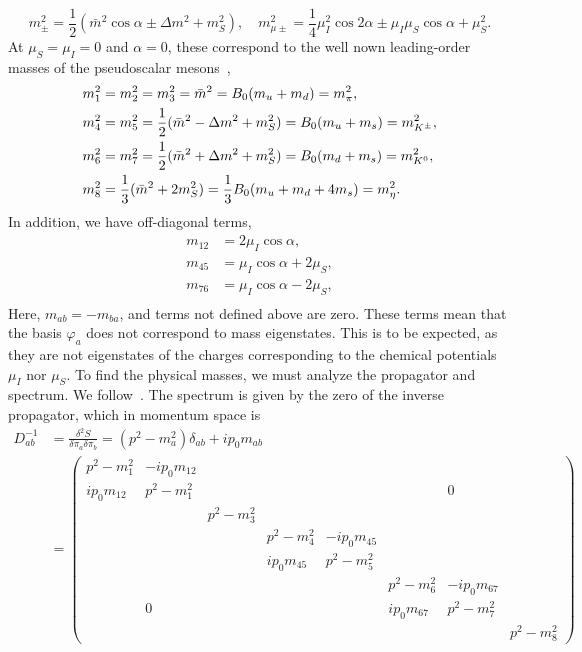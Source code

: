 %
\begin{equation}
    m_\pm^2 = \frac{1}{2} (\bar m^2 \cos\alpha \pm \Delta m^2 + m_S^2),
    \quad
    m^2_{\mu\pm } = \frac{1}{4}\mu_I^2 \cos2\alpha \pm \mu_I\mu_S \cos\alpha + \mu_S^2.
\end{equation}
%
At $\mu_S = \mu_I = 0$ and $\alpha = 0$, these correspond to the well nown leading-order masses of the pseudoscalar mesons~\autocite{eckerChiralPerturbationTheory1995},
%
\begin{align}
    m_1^2 & = m_2^2 = m_3^2 
    = \bar m^2 
    = B_0(m_u + m_d) = m_\pi^2, \\
    m_4^2 & = m_5^2 
    = \frac{1}{2} (\bar m^2 - \Delta m^2 + m_S^2) 
    = B_0(m_u + m_s) = m_{{K^\pm}}^2, \\
    m_6^2 &= m_7^2 
    = \frac{1}{2} (\bar m^2 + \Delta m^2 + m_S^2) 
    = B_0(m_d + m_s) = m_{{K^0} }^2, \\
    m_8^2 
    &= \frac{1}{3}(\bar m^2  + 2m_S^2) 
    = \frac{1}{3}B_0(m_u + m_d + 4m_s) = m_\eta^2 .
\end{align}
%
In addition, we have off-diagonal terms,
%
\begin{align}
    m_{12} & = 2 \mu_I\cos\alpha,\\
    m_{45} & =\mu_I\cos\alpha + 2\mu_S, \\
    m_{76} & = \mu_I\cos\alpha - 2\mu_S, \\
\end{align}
Here, $m_{ab} = -m_{ba}$, and terms not defined above are zero.
These terms mean that the basis $\varphi_a$ does not correspond to mass eigenstates.
This is to be expected, as they are not eigenstates of the charges corresponding to the chemical potentials $\mu_I$ nor $\mu_S$.
To find the physical masses, we must analyze the propagator and spectrum.
We follow~\autocite{adhikariTwoflavorChiralPerturbation2019,adhikariQuarkPionAxial2021a}.
The spectrum is given by the zero of the inverse propagator, which in momentum space is
%
\begin{align}
    \nonumber
    D_{ab}^{-1} 
    &= \frac{\delta^2S}{\delta \pi_a \delta \pi_b}
    =
    (p^2 - m_a^2)\delta_{ab} + i p_0 m_{ab}\\
    &= 
    \begin{pmatrix}
        p^2 - m_1^2 & -ip_0 m_{12} &&&&&&\\
        ip_0 m_{12} & p^2 - m_1^2 &&&&&0&\\
        &&p^2 - m_3^2&&&&&\\
        &&&p^2 - m_4^2&-ip_0 m_{45}&&&\\
        &&&ip_0 m_{45}&p^2 - m_5^2&&&\\
        &&&&&p^2 - m_6^2&-ip_0 m_{67}&\\
        &0&&&&ip_0 m_{67}&p^2 - m_7^2&\\
        &&&&&&&p^2 - m_8^2
    \end{pmatrix}
\end{align}
